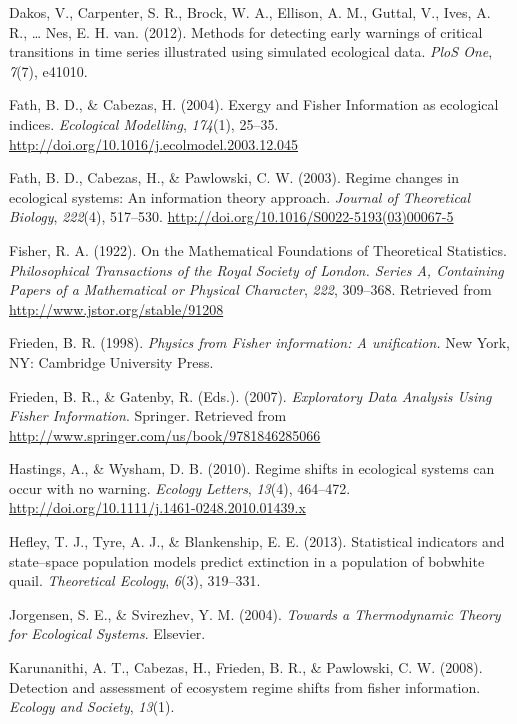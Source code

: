 \documentclass[12pt,twoside,openany]{reedthesis}
\begin{document}
\hypertarget{ref-dakos_methods_2012}{}
Dakos, V., Carpenter, S. R., Brock, W. A., Ellison, A. M., Guttal, V.,
Ives, A. R., \ldots{} Nes, E. H. van. (2012). Methods for detecting
early warnings of critical transitions in time series illustrated using
simulated ecological data. \emph{PloS One}, \emph{7}(7), e41010.

\hypertarget{ref-fath_exergy_2004}{}
Fath, B. D., \& Cabezas, H. (2004). Exergy and Fisher Information as
ecological indices. \emph{Ecological Modelling}, \emph{174}(1), 25--35.
\url{http://doi.org/10.1016/j.ecolmodel.2003.12.045}

\hypertarget{ref-fath_regime_2003}{}
Fath, B. D., Cabezas, H., \& Pawlowski, C. W. (2003). Regime changes in
ecological systems: An information theory approach. \emph{Journal of
Theoretical Biology}, \emph{222}(4), 517--530.
\url{http://doi.org/10.1016/S0022-5193(03)00067-5}

\hypertarget{ref-fisher_mathematical_1922}{}
Fisher, R. A. (1922). On the Mathematical Foundations of Theoretical
Statistics. \emph{Philosophical Transactions of the Royal Society of
London. Series A, Containing Papers of a Mathematical or Physical
Character}, \emph{222}, 309--368. Retrieved from
\url{http://www.jstor.org/stable/91208}

\hypertarget{ref-frieden_physics_1998}{}
Frieden, B. R. (1998). \emph{Physics from Fisher information: A
unification.} New York, NY: Cambridge University Press.

\hypertarget{ref-frieden_exploratory_2007}{}
Frieden, B. R., \& Gatenby, R. (Eds.). (2007). \emph{Exploratory Data
Analysis Using Fisher Information}. Springer. Retrieved from
\url{http://www.springer.com/us/book/9781846285066}

\hypertarget{ref-hastings_regime_2010}{}
Hastings, A., \& Wysham, D. B. (2010). Regime shifts in ecological
systems can occur with no warning. \emph{Ecology Letters}, \emph{13}(4),
464--472. \url{http://doi.org/10.1111/j.1461-0248.2010.01439.x}

\hypertarget{ref-hefley2013statistical}{}
Hefley, T. J., Tyre, A. J., \& Blankenship, E. E. (2013). Statistical
indicators and state--space population models predict extinction in a
population of bobwhite quail. \emph{Theoretical Ecology}, \emph{6}(3),
319--331.

\hypertarget{ref-jorgensen_towards_2004}{}
Jorgensen, S. E., \& Svirezhev, Y. M. (2004). \emph{Towards a
Thermodynamic Theory for Ecological Systems}. Elsevier.

\hypertarget{ref-karunanithi_detection_2008}{}
Karunanithi, A. T., Cabezas, H., Frieden, B. R., \& Pawlowski, C. W.
(2008). Detection and assessment of ecosystem regime shifts from fisher
information. \emph{Ecology and Society}, \emph{13}(1).
\end{document}
